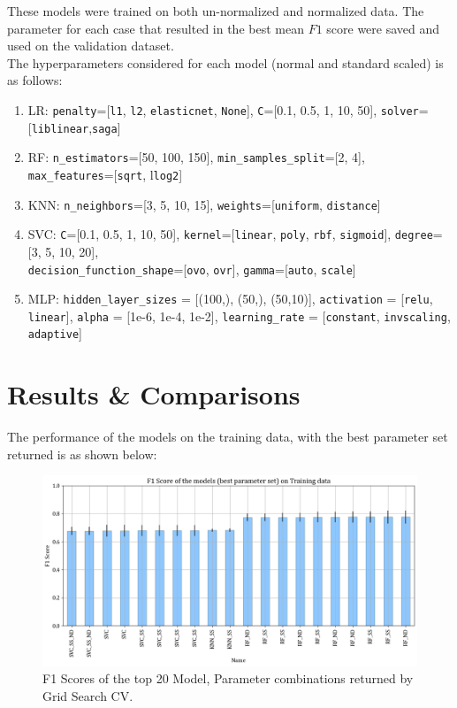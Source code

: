 \documentclass[11pt,a4paper]{article}
\newcommand{\noi}{\noindent}
\begin{document}
\noi
These models were trained on both un-normalized and normalized data. The parameter for each case that resulted in the best mean $F1$ score were saved and used on the validation dataset.\\

\noi
The hyperparameters considered for each model (normal and standard scaled) is as follows:
\begin{enumerate}
	\item LR: \texttt{penalty}=[\texttt{l1}, \texttt{l2}, \texttt{elasticnet}, \texttt{None}], \texttt{C}=[0.1, 0.5, 1, 10, 50], \texttt{solver}=[\texttt{liblinear},\texttt{saga}]
	\item RF: \texttt{n\_estimators}=[50, 100, 150], \texttt{min\_samples\_split}=[2, 4], \texttt{max\_features}=[\texttt{sqrt}, l\texttt{log2}]
	\item KNN: \texttt{n\_neighbors}=[3, 5, 10, 15], \texttt{weights}=[\texttt{uniform}, \texttt{distance}]
	\item SVC: \texttt{C}=[0.1, 0.5, 1, 10, 50], \texttt{kernel}=[\texttt{linear}, \texttt{poly}, \texttt{rbf}, \texttt{sigmoid}], \texttt{degree}=[3, 5, 10, 20], \\
	\texttt{decision\_function\_shape}=[\texttt{ovo}, \texttt{ovr}], \texttt{gamma}=[\texttt{auto}, \texttt{scale}]
	\item MLP: \texttt{hidden\_layer\_sizes} = [(100,), (50,), (50,10)], \texttt{activation} = [\texttt{relu}, \texttt{linear}], \texttt{alpha} = [1e-6, 1e-4, 1e-2], \texttt{learning\_rate} = [\texttt{constant}, \texttt{invscaling}, \texttt{adaptive}]
\end{enumerate}

\section{Results \& Comparisons}
The performance of the models on the training data, with the best parameter set returned is as shown below:
\begin{figure}[H]
	\centering
	\includegraphics[scale=0.5]{images/top_20_models.png}
	\caption{F1 Scores of the top 20 Model, Parameter combinations returned by Grid Search CV.}
	\label{fig:best_models}
\end{figure}
\end{document}
